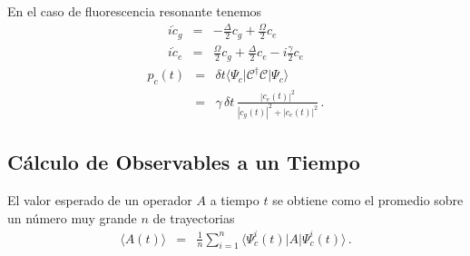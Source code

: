 \documentclass[twocolumn,aps,eqsecnum,showkeys,amsmath]{revtex4}
\newcommand{\mcC}{\mathcal{C}}
\providecommand{\vxp}[1]{\langle #1 \rangle}
\providecommand{\bra}[1]{\langle #1 \rvert}
\providecommand{\ket}[1]{\lvert #1 \rangle}
\begin{document}
En el caso de fluorescencia resonante tenemos  
%
\begin{subequations}
\label{eq:DirectSSEamp}
\begin{eqnarray}
i \dot{c}_g &=& -\frac{\Delta}{2} c_g + \frac{\Omega}{2} c_e  \\
%
i \dot{c}_e &=& \frac{\Omega}{2} c_g +\frac{\Delta}{2} c_e -i\frac{\gamma}{2} c_e 
\end{eqnarray}
\end{subequations}
%
\begin{eqnarray}
p_c(t) &=& \delta t \bra{\Psi_c} \mcC^\dag \mcC \ket{\Psi_c} 	\\
	 &=& \gamma\, \delta t \, \frac{|c_e(t)|^2}{|c_g(t)|^2 +|c_e(t)|^2} \,. 
	 \nonumber 
\end{eqnarray}

\subsection{C\'alculo de Observables a un Tiempo}
El valor esperado de un operador $A$ a tiempo $t$ se obtiene como el promedio 
sobre un n\'umero muy grande $n$ de trayectorias 
\begin{eqnarray} 	
\vxp{A (t)} &=& 
	\frac{1}{n} \sum_{i=1}^n \bra{\Psi_c^i (t)} A \ket{\Psi_c^i (t)} \,.
\end{eqnarray}

\end{document}
